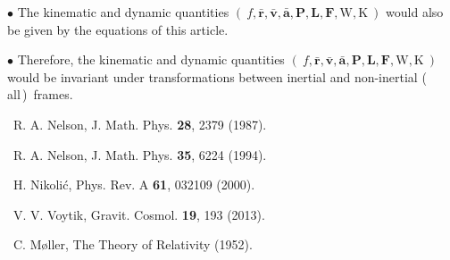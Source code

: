 \documentclass[10pt,fleqn]{article}
\begin{document}
\par \medskip \smallskip
\noindent $\bullet$ The kinematic and dynamic quantities {\small $( \: f, \bar{\mathbf{r}}, \bar{\mathbf{v}}, \bar{\mathbf{a}}, \mathbf{P}, \mathbf{L}, \mathbf{F}, \mathrm{W}, \mathrm{K} \: )$} would also be given by the equations of this article.
\par \medskip \smallskip
\noindent $\bullet$ Therefore, the kinematic and dynamic quantities {\small $( \: f, \bar{\mathbf{r}}, \bar{\mathbf{v}}, \bar{\mathbf{a}}, \mathbf{P}, \mathbf{L}, \mathbf{F}, \mathrm{W}, \mathrm{K} \: )$} would be invariant under transformations between inertial and non\hspace{+0.03em}-\hspace{+0.03em}inertial \hbox{(\,all\,) frames}.

\vspace{+0.45em}

\par {}

\bigskip \medskip

\par \noindent [1] \, R. A. Nelson, J. Math. Phys. {\bf 28}, 2379 (1987).
\medskip \smallskip
\par \noindent [2] \, R. A. Nelson, J. Math. Phys. {\bf 35}, 6224 (1994).
\medskip \smallskip
\par \noindent [3] \, H. Nikoli\'c,\hspace{+0.12em} Phys. Rev. A\hspace{+0.12em} {\bf 61},\hspace{+0.09em} 032109\hspace{+0.09em} (2000).
\medskip \smallskip
\par \noindent [4] \, V. V. Voytik, Gravit. Cosmol. {\bf 19}, 193 (2013).
\medskip \smallskip
\par \noindent [5] \, C. M{\o}ller, The Theory of Relativity (1952).

\newpage

\par {}

\bigskip \smallskip
\end{document}
